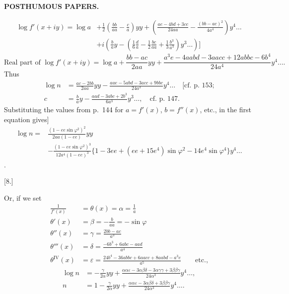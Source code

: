 \par\clearpage
\noindent{}\hfill{\small\textbf{POSTHUMOUS PAPERS.}}\hfill\null\par\medskip

\[
\begin{aligned}
\log f'(x+iy)=\log a
 &+\tfrac12\left(\frac{bb}{aa}-\frac ca\right)yy
 +\left(\frac{ae-4bd+3cc}{24aa}-\frac{(bb-ac)^2}{4a^4}\right)y^4\ldots\\
 &+i\left(\frac ba y-\left(\tfrac16\frac da-\tfrac12\frac{bc}{aa}
 +\tfrac13\frac{b^3}{a^3}\right)y^3\ldots\right)\mathclose{]}
\end{aligned}
\]
\[
\text{Real part of }\log f'(x+iy)=\log a+\frac{bb-ac}{2aa}yy
+\frac{a^3e-4aabd-3aacc+12abbc-6b^4}{24a^4}y^4\ldots.
\]
\noindent Thus
\[
\begin{aligned}
\log n&=\frac{ac-2bb}{2aa}yy-\frac{aae-5abd-3acc+9bbc}{24a^3}y^4\ldots
 \quad\text{[cf.\ p.\ 153;}\\
c&=\frac ba y-\frac{aad-3abc+2b^3}{6a^3}y^3\ldots,
 \quad\text{cf.\ p.\ 147.}
\end{aligned}
\]
\noindent Substituting the values from p.\ 144 for \(a=f'(x)\), \(b=f''(x)\), etc.,
in the first equation gives]
\[
\begin{aligned}
\log n={}&\frac{(1-ee\sin\varphi^2)^2}{2aa(1-ee)}yy\\
 &-\frac{(1-ee\sin\varphi^2)^3}{12a^4(1-ee)^3}
 \{1-3ee+(ee+15e^4)\sin\varphi^2-14e^4\sin\varphi^4\}y^4\ldots
\end{aligned}
\]
.

\begin{center}[8.]\end{center}
Or, if we set
\[
\begin{aligned}
\frac1{f'(x)}&=\theta(x)=\alpha=\frac1a\\
\theta'(x)&=\beta=-\frac b{aa}=-\sin\varphi\\
\theta''(x)&=\gamma=\frac{2bb-ac}{a^3}\\
\theta'''(x)&=\delta=\frac{-6b^3+6abc-aad}{a^4}\\
\theta^{\mathrm{IV}}(x)&=\varepsilon
=\frac{24b^4-36abbc+6aacc+8aabd-a^3e}{a^5}\qquad\text{etc.,}
\end{aligned}
\]
\noindent [then]
\[
\begin{aligned}
\log n&=-\frac{\gamma}{2\alpha}yy+
 \frac{\alpha\alpha\varepsilon-3\alpha\beta\delta-3\alpha\gamma\gamma+3\beta\beta\gamma}{24\alpha^3}
 y^4\ldots,\\
n&=1-\frac{\gamma}{2\alpha}yy+
 \frac{\alpha\alpha\varepsilon-3\alpha\beta\delta+3\beta\beta\gamma}{24\alpha^3}
 y^4\ldots.
\end{aligned}
\]

